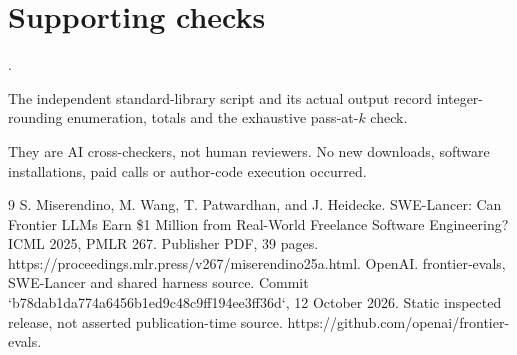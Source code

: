 \documentclass[10pt]{article}
\begin{document}
\section*{Supporting checks}
.\par
The independent standard-library script and its actual output record integer-rounding enumeration, totals and the exhaustive pass-at-\(k\) check.\par
They are AI cross-checkers, not human reviewers. No new downloads, software installations, paid calls or author-code execution occurred.\par
9 S. Miserendino, M. Wang, T. Patwardhan, and J. Heidecke. SWE-Lancer: Can Frontier LLMs Earn \$1 Million from Real-World Freelance Software Engineering? ICML 2025, PMLR 267. Publisher PDF, 39 pages. https://proceedings.mlr.press/v267/miserendino25a.html. OpenAI. frontier-evals, SWE-Lancer and shared harness source. Commit `b78dab1da774a6456b1ed9c48c9ff194ee3ff36d`, 12 October 2026. Static inspected release, not asserted publication-time source. https://github.com/openai/frontier-evals.\par
\end{document}
